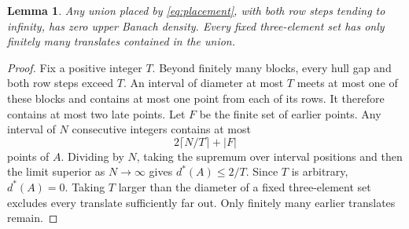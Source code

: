 \documentclass[11pt,leqno]{amsart}
\numberwithin{equation}{section}
\newtheorem{lemma}[theorem]{Lemma}
\theoremstyle{definition}
\theoremstyle{remark}
\begin{document}
\begin{lemma}\label{lem:sparse}
Any union placed by \eqref{eq:placement}, with both row steps tending to infinity, has zero upper Banach density. Every fixed three-element set has only finitely many translates contained in the union.
\end{lemma}
\begin{proof}
Fix a positive integer $T$. Beyond finitely many blocks, every hull gap and both row steps exceed $T$. An interval of diameter at most $T$ meets at most one of these blocks and contains at most one point from each of its rows. It therefore contains at most two late points. Let $F$ be the finite set of earlier points. Any interval of $N$ consecutive integers contains at most
\[
2\lceil N/T\rceil+|F|
\]
points of $A$. Dividing by $N$, taking the supremum over interval positions and then the limit superior as $N\to\infty$ gives $d^*(A)\le2/T$. Since $T$ is arbitrary, $d^*(A)=0$. Taking $T$ larger than the diameter of a fixed three-element set excludes every translate sufficiently far out. Only finitely many earlier translates remain.
\end{proof}
\end{document}
